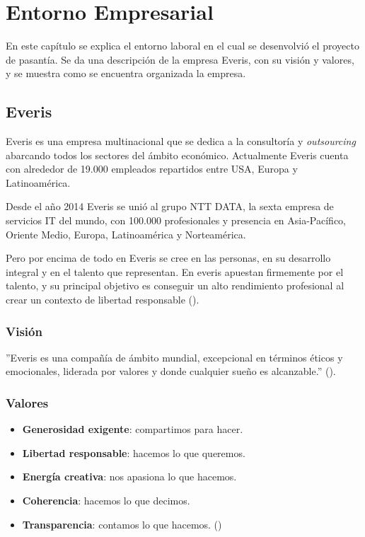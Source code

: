 \chapter{Entorno Empresarial}
\label{capitulo1}

En este capítulo se explica el entorno laboral en el cual se
desenvolvió el proyecto de pasantía. Se da una descripción
de la empresa Everis, con su visión y valores, y se muestra
como se encuentra organizada la empresa.


\section{Everis}

Everis es una empresa multinacional que se dedica a la consultoría y
\emph{outsourcing} abarcando todos los sectores del ámbito económico.
Actualmente Everis cuenta con alrededor de 19.000
empleados repartidos entre USA, Europa y Latinoamérica.

Desde el año 2014 Everis se unió al grupo NTT DATA, la sexta empresa de
servicios IT del mundo, con 100.000 profesionales y presencia en Asia-Pacífico,
Oriente Medio, Europa, Latinoamérica y Norteamérica.

Pero por encima de todo en Everis se cree en las personas, en su desarrollo integral y en
el talento que representan. En everis apuestan firmemente por el talento, y
su principal objetivo es conseguir un alto rendimiento profesional al crear
un contexto de libertad responsable (\cite{EVERIS}).

\subsection{Visión}

''Everis es una compañía de ámbito mundial, excepcional en términos éticos y
emocionales, liderada por valores y donde cualquier sueño es alcanzable.'' (\cite{EVERIS}).

\subsection{Valores}

\begin{itemize}
  \item \textbf{Generosidad exigente}: compartimos para hacer.
  \item \textbf{Libertad responsable}: hacemos lo que queremos.
  \item \textbf{Energía creativa}: nos apasiona lo que hacemos.
  \item \textbf{Coherencia}: hacemos lo que decimos.
  \item \textbf{Transparencia}: contamos lo que hacemos. (\cite{EVERIS})
\end{itemize}


